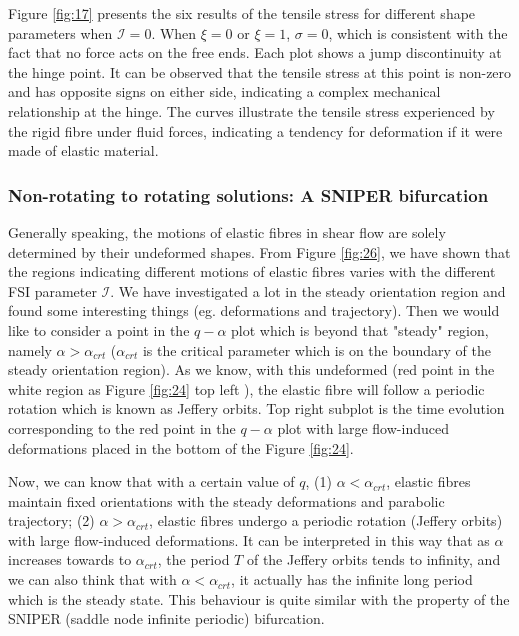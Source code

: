 \documentclass[lineno]{JFM-FLM_Au}
\begin{document}
Figure \ref{fig:17} presents the six results of the tensile stress for different shape parameters when $\mathcal{I}=0$. When $\xi=0$ or $\xi=1$, $\sigma=0$, which is consistent with the fact that no force acts on the free ends. Each plot shows a jump discontinuity at the hinge point. It can be observed that the tensile stress at this point is non-zero and has opposite signs on either side, indicating a complex mechanical relationship at the hinge. The curves illustrate the tensile stress experienced by the rigid fibre under fluid forces, indicating a tendency for deformation if it were made of elastic material. 

\subsubsection{Non-rotating to rotating solutions: A SNIPER bifurcation}
Generally speaking, the motions of elastic fibres in shear flow are solely determined by their undeformed shapes. From Figure \ref{fig:26}, we have shown that the regions indicating different motions of elastic fibres varies with the different FSI parameter $\mathcal{I}$. We have investigated a lot in the steady orientation region and found some interesting things (eg. deformations and trajectory). Then we would like to consider a point in the $q-\alpha$ plot which is beyond that "steady" region, namely $\alpha>\alpha_{crt}$ ($\alpha_{crt}$ is the critical parameter which is on the boundary of the steady orientation region). As we know, with this undeformed (red point in the white region as Figure \ref{fig:24} top left ), the elastic fibre will follow a periodic rotation which is known as Jeffery orbits. Top right subplot is the time evolution corresponding to the red point in the $q-\alpha$ plot with large flow-induced deformations placed in the bottom of the Figure \ref{fig:24}. 

Now, we can know that with a certain value of $q$, (1) $\alpha<\alpha_{crt}$, elastic fibres maintain fixed orientations with the steady deformations and parabolic trajectory; (2) $\alpha>\alpha_{crt}$, elastic fibres undergo a periodic rotation (Jeffery orbits) with large flow-induced deformations. It can be interpreted in this way that as $\alpha$ increases towards to $\alpha_{crt}$, the period $T$ of the Jeffery orbits tends to infinity, and we can also think that with $\alpha<\alpha_{crt}$, it actually has the infinite long period which is the steady state. This behaviour is quite similar with the property of the SNIPER (saddle node infinite periodic) bifurcation.
\end{document}
